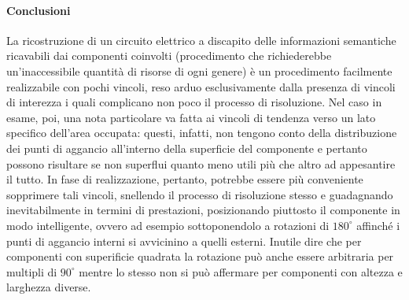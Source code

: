 \paragraph{Conclusioni}
La ricostruzione di un circuito elettrico a discapito delle informazioni semantiche ricavabili dai componenti coinvolti (procedimento che richiederebbe un'inaccessibile quantità di risorse di ogni genere) è un procedimento facilmente realizzabile con pochi vincoli, reso arduo esclusivamente dalla presenza di vincoli di interezza i quali complicano non poco il processo di risoluzione. Nel caso in esame, poi, una nota particolare va fatta ai vincoli di tendenza verso un lato specifico dell'area occupata: questi, infatti, non tengono conto della distribuzione dei punti di aggancio all'interno della superficie del componente e pertanto possono risultare se non superflui quanto meno utili più che altro ad appesantire il tutto. In fase di realizzazione, pertanto, potrebbe essere più conveniente sopprimere tali vincoli, snellendo il processo di risoluzione stesso e guadagnando inevitabilmente in termini di prestazioni, posizionando piuttosto il componente in modo intelligente, ovvero ad esempio sottoponendolo a rotazioni di $180^\circ$ affinché i punti di aggancio interni si avvicinino a quelli esterni. Inutile dire che per componenti con superificie quadrata la rotazione può anche essere arbitraria per multipli di $90^\circ$ mentre lo stesso non si può affermare per componenti con altezza e larghezza diverse.